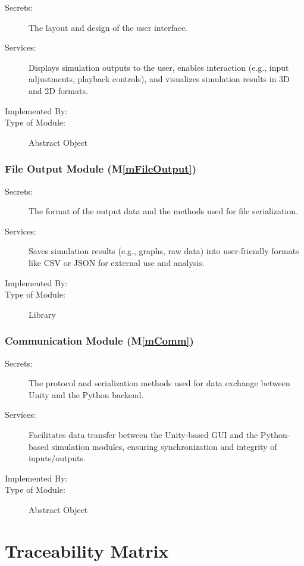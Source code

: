 \documentclass[12pt, titlepage]{article}
\newcommand{\mref}[1]{M\ref{#1}}
\begin{document}
\begin{description}
\item[Secrets:] The layout and design of the user interface.
\item[Services:] Displays simulation outputs to the user, enables interaction (e.g., input adjustments, playback controls), and visualizes simulation results in 3D and 2D formats.
\item[Implemented By:] \progname{}
\item[Type of Module:] Abstract Object
\end{description}

\subsubsection{File Output Module (\mref{mFileOutput})}

\begin{description}
\item[Secrets:] The format of the output data and the methods used for file serialization.
\item[Services:] Saves simulation results (e.g., graphs, raw data) into user-friendly formats like CSV or JSON for external use and analysis.
\item[Implemented By:] \progname{}
\item[Type of Module:] Library
\end{description}

\subsubsection{Communication Module (\mref{mComm})}

\begin{description}
\item[Secrets:] The protocol and serialization methods used for data exchange between Unity and the Python backend.
\item[Services:] Facilitates data transfer between the Unity-based GUI and the Python-based simulation modules, ensuring synchronization and integrity of inputs/outputs.
\item[Implemented By:] \progname{}
\item[Type of Module:] Abstract Object
\end{description}

\section{Traceability Matrix} \label{SecTM}
\end{document}
